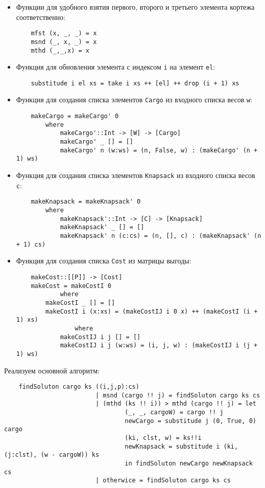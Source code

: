 \documentclass[14pt,a4paper]{extarticle}
\begin{document}
	\begin{itemize}
		\item Функции для удобного взятия первого, второго и третьего элемента кортежа соответственно: 
		\lstset{language=haskell}
		\begin{lstlisting}
	mfst (x, _, _) = x
	msnd (_, x, _) = x
	mthd (_,_,x) = x
		\end{lstlisting}
		\item Функция для обновления элемента с индексом \texttt{i} на элемент \texttt{el}:
		\lstset{language=haskell}
		\begin{lstlisting}
	substitude i el xs = take i xs ++ [el] ++ drop (i + 1) xs
		\end{lstlisting}
		\item Функция для создания списка элементов \texttt{Cargo} из входного списка весов \texttt{w}:
		\lstset{language=haskell}
		\begin{lstlisting}
	makeCargo = makeCargo' 0 
        where
            makeCargo'::Int -> [W] -> [Cargo]
            makeCargo' _ [] = []
            makeCargo' n (w:ws) = (n, False, w) : (makeCargo' (n + 1) ws)
		\end{lstlisting}
		\item Функция для создания списка элементов \texttt{Knapsack} из входного списка весов \texttt{с}:
		\lstset{language=haskell}
		\begin{lstlisting}
	makeKnapsack = makeKnapsack' 0 
        where
            makeKnapsack'::Int -> [C] -> [Knapsack]
            makeKnapsack' _ [] = []
            makeKnapsack' n (c:cs) = (n, [], c) : (makeKnapsack' (n + 1) cs) 
		\end{lstlisting}
		
		\item Функция для создания списка \texttt{Cost} из матрицы выгоды:
		\lstset{language=haskell}
		\begin{lstlisting}
	makeCost::[[P]] -> [Cost]
	makeCost = makeCostI 0
            where
        makeCostI _ [] = []
        makeCostI i (x:xs) = (makeCostIJ i 0 x) ++ (makeCostI (i + 1) xs)
                where
            makeCostIJ i j [] = []  
            makeCostIJ i j (w:ws) = (i, j, w) : (makeCostIJ i (j + 1) ws)
		\end{lstlisting}
	\end{itemize}
	
	Реализуем основной алгоритм:
	\lstset{language=haskell}
	\begin{lstlisting}
    findSoluton cargo ks ((i,j,p):cs) 
                         | msnd (cargo !! j) = findSoluton cargo ks cs
                         | (mthd (ks !! i)) > mthd (cargo !! j) = let
                                 (_, _, cargoW) = cargo !! j
                                 newCargo = substitude j (0, True, 0) cargo
                                 (ki, clst, w) = ks!!i
                                 newKnapsack = substitude i (ki, (j:clst), (w - cargoW)) ks
                                 in findSoluton newCargo newKnapsack cs
                         | otherwice = findSoluton cargo ks cs
	\end{lstlisting}
	
\end{document}
